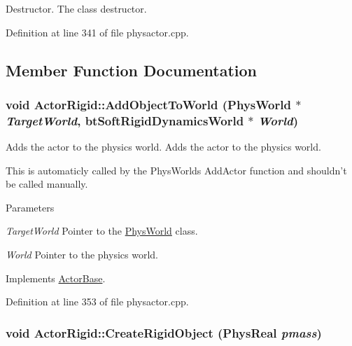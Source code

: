 Destructor. The class destructor. 

Definition at line 341 of file physactor.cpp.

\subsection{Member Function Documentation}
\hypertarget{classActorRigid_ac6d7e05944623329f0c2140c19e2c49e}{
\subsubsection[{AddObjectToWorld}]{\setlength{\rightskip}{0pt plus 5cm}void ActorRigid::AddObjectToWorld ({\bf PhysWorld} $\ast$ {\em TargetWorld}, \/  btSoftRigidDynamicsWorld $\ast$ {\em World})}}
\label{d5/d10/classActorRigid_ac6d7e05944623329f0c2140c19e2c49e}


Adds the actor to the physics world. Adds the actor to the physics world. \par
 This is automaticly called by the PhysWorlds AddActor function and shouldn't be called manually. 
\begin{DoxyParams}{Parameters}
\item[{\em TargetWorld}]Pointer to the \hyperlink{classPhysWorld}{PhysWorld} class. \item[{\em World}]Pointer to the physics world. \end{DoxyParams}


Implements \hyperlink{classActorBase_a1af82a2ed960fd114518fdf84d5ff146}{ActorBase}.

Definition at line 353 of file physactor.cpp.\hypertarget{classActorRigid_ac651eed187c3cb912bc7f294f0b42ad1}{
\subsubsection[{CreateRigidObject}]{\setlength{\rightskip}{0pt plus 5cm}void ActorRigid::CreateRigidObject (PhysReal {\em pmass})}}
\label{d5/d10/classActorRigid_ac651eed187c3cb912bc7f294f0b42ad1}


